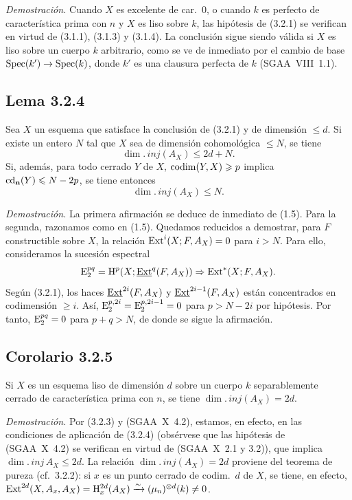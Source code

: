 \emph{Demostración.} Cuando $X$ es excelente de car.~0, o cuando $k$ es perfecto de característica prima con $n$ y $X$ es liso sobre $k$, las hipótesis de (3.2.1) se verifican en virtud de (3.1.1), (3.1.3) y (3.1.4). La conclusión sigue siendo válida si $X$ es liso sobre un cuerpo $k$ arbitrario, como se ve de inmediato por el cambio de base $\operatorname{Spec}(k') \to \operatorname{Spec}(k)$, donde $k'$ es una clausura perfecta de $k$ (SGAA~VIII~1.1).

\subsection*{Lema 3.2.4}
Sea $X$ un esquema que satisface la conclusión de (3.2.1) y de dimensión $\leqslant d$. Si existe un entero $N$ tal que $X$ sea de dimensión cohomológica $\leqslant N$, se tiene
\[
\dim.\,inj(A_X) \leqslant 2d + N.
\]
Si, además, para todo cerrado $Y$ de $X$, $\operatorname{codim}(Y,X) \geqslant p$ implica $\operatorname{cd}_{\mathbf{n}}(Y) \leqslant N - 2p$, se tiene entonces
\[
\dim.\,inj(A_X) \leqslant N.
\]

\emph{Demostración.} La primera afirmación se deduce de inmediato de (1.5). Para la segunda, razonamos como en (1.5). Quedamos reducidos a demostrar, para $F$ constructible sobre $X$, la relación $\operatorname{Ext}^i(X; F, A_X) = 0$ para $i > N$. Para ello, consideramos la sucesión espectral
\[
\mathrm{E}_2^{pq} = \mathrm{H}^p(X; \underline{\operatorname{Ext}}^q(F, A_X)) \Rightarrow \operatorname{Ext}^{*}(X; F, A_X).
\]
Según (3.2.1), los haces $\underline{\operatorname{Ext}}^{2i}(F, A_X)$ y $\underline{\operatorname{Ext}}^{2i-1}(F, A_X)$ están concentrados en codimensión $\geqslant i$. Así, $\mathrm{E}_2^{p,2i} = \mathrm{E}_2^{p,2i-1} = 0$ para $p > N - 2i$ por hipótesis. Por tanto, $\mathrm{E}_2^{pq} = 0$ para $p+q > N$, de donde se sigue la afirmación.

\subsection*{Corolario 3.2.5}
Si $X$ es un esquema liso de dimensión $d$ sobre un cuerpo $k$ separablemente cerrado de característica prima con $n$, se tiene $\dim.\,inj(A_X) = 2d$.

\emph{Demostración.} Por (3.2.3) y (SGAA~X~4.2), estamos, en efecto, en las condiciones de aplicación de (3.2.4) (obsérvese que las hipótesis de (SGAA~X~4.2) se verifican en virtud de (SGAA~X~2.1 y 3.2)), que implica $\dim.\,inj\, A_X \leqslant 2d$. La relación $\dim.\,inj(A_X) = 2d$ proviene del teorema de pureza (cf.~3.2.2): si $x$ es un punto cerrado de codim.~$d$ de $X$, se tiene, en efecto, $\operatorname{Ext}^{2d}(X, A_x, A_X) = \mathrm{H}^{2d}_x(A_X) \xrightarrow{\sim} (\mu_n)^{\otimes d}(k) \neq 0$.
